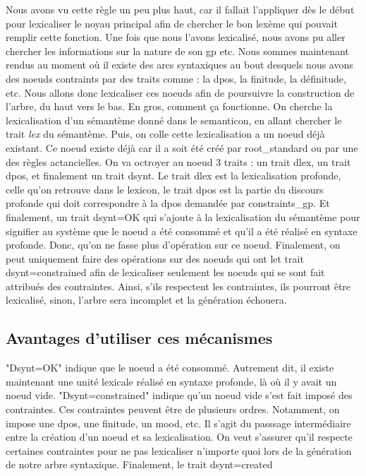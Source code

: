 \documentclass[12pt,maitrise,frenchb,natbib,twoside,initial]{dms}
\numberwithin{equation}{section}
\numberwithin{table}{chapter}
\numberwithin{figure}{chapter}
\begin{document}
Nous avons vu cette règle un peu plus haut, car il fallait l'appliquer dès le début pour lexicaliser le noyau principal afin de chercher le bon lexème qui pouvait remplir cette fonction. Une fois que nous l'avons lexicalisé, nous avons pu aller chercher les informations sur la nature de son gp etc. Nous sommes maintenant rendus au moment où il existe des arcs syntaxiques au bout desquels nous avons des noeuds contraints par des traits comme : la dpos, la finitude, la définitude, etc. Nous allons donc lexicaliser ces noeuds afin de poursuivre la construction de l'arbre, du haut vers le bas. En gros, comment ça fonctionne. On cherche la lexicalisation d'un sémantème donné dans le semanticon, en allant chercher le trait \emph{lex} du sémantème. Puis, on colle cette lexicalisation a un noeud déjà existant. Ce noeud existe déjà car il a soit été créé par root{\_}standard ou par une des règles actancielles. On va octroyer au noeud 3 traits : un trait dlex, un trait dpos, et finalement un trait dsynt. Le trait dlex est la lexicalisation profonde, celle qu'on retrouve dans le lexicon, le trait dpos est la partie du discours profonde qui doit correspondre à la dpos demandée par constraints{\_}gp. Et finalement, un trait dsynt=OK qui s'ajoute à la lexicalisation du sémantème pour signifier au système que le noeud a été consommé et qu'il a été réalisé en syntaxe profonde. Donc, qu'on ne fasse plus d'opération sur ce noeud. Finalement, on peut uniquement faire des opérations sur des noeuds qui ont let trait dsynt=constrained afin de lexicaliser seulement les noeuds qui se sont fait attribués des contraintes. Ainsi, s'ils respectent les contraintes, ils pourront être lexicalisé, sinon, l'arbre sera incomplet et la génération échouera.

\subsection{Avantages d'utiliser ces mécanismes}

"Dsynt=OK" indique que le noeud a été consommé. Autrement dit, il existe maintenant une unité lexicale réalisé en syntaxe profonde, là où il y avait un noeud vide.
"Dsynt=constrained" indique qu'un noeud vide s'est fait imposé des contraintes. Ces contraintes peuvent être de plusieurs ordres. Notamment, on impose une dpos, une finitude, un mood, etc. Il s'agit du passsage intermédiaire entre la création d'un noeud et sa lexicalisation. On veut s'assurer qu'il respecte certaines contraintes pour ne pas lexicaliser n'importe quoi lors de la génération de notre arbre syntaxique.
Finalement, le trait dsynt=created 
\end{document}
